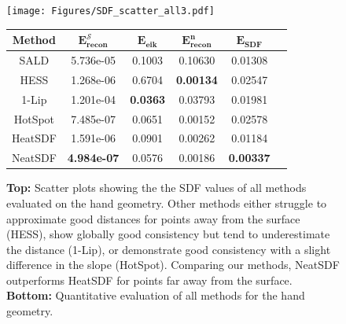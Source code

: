 \documentclass[12pt,openany]{book}
\theoremstyle{plainnormal}
\theoremstyle{remark}
\begin{document}
\begin{figure}
\hspace*{-0.3cm}
\texttt{[image: Figures/SDF\_scatter\_all3.pdf]}
\vspace*{0.5cm}  %
    \par  %
        \begin{tabular}{cccccc}
        \toprule
        \textbf{Method} &$\mathbf{E_{recon}^{\mathcal{S}}}$ & $\mathbf{E_{eik}}$ &$\mathbf{E_{recon}^n}$ & $\mathbf{E_{SDF}}$\\ 
        \midrule
        SALD & 5.736e-05 &  0.1003 & 0.10630 & 0.01308\\ %
        HESS & 1.268e-06  &  0.6704 &\textbf{0.00134} &0.02547   \\ 
        1-Lip   & 1.201e-04   & \textbf{0.0363} &0.03793&0.01981\\  %
        HotSpot  &7.485e-07 &   0.0651 & 0.00152 &  0.02578\\  %
        \midrule
        HeatSDF & 1.591e-06  & 0.0901 &  0.00262&0.01184\\  %
        
        NeatSDF & \textbf{4.984e-07} & 0.0576 & 0.00186 & \textbf{0.00337} \\%
        \bottomrule
    \end{tabular}
    \caption{\textbf{Top:} Scatter plots showing the the SDF values of all methods evaluated on the hand geometry. Other methods either struggle to approximate good distances for points away from the surface (HESS), show globally good consistency but tend to underestimate the distance (1-Lip), or demonstrate good consistency with a slight difference in the slope (HotSpot). Comparing our methods, NeatSDF outperforms HeatSDF for points far away from the surface. \textbf{Bottom:} Quantitative evaluation of all methods for the hand geometry.}
    \label{tab:handquant}
\end{figure}
        
\end{document}
